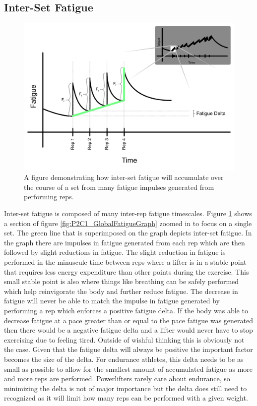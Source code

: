 \subsection{Inter-Set Fatigue}
\label{sec:P2C1_InterSetFatigue}

\begin{figure}[htb]
    \centering
    \includegraphics[scale=0.55]{images/ch2/InterSetFatigue.png}
    \caption{A figure demonstrating how inter-set fatigue will accumulate over the course of a set from many fatigue impulses generated from performing reps.}
    \label{fig:P2C1_InterSetFatigue}
\end{figure}

Inter-set fatigue is composed of many inter-rep fatigue timescales. Figure \ref{fig:P2C1_InterSetFatigue} shows a section of figure \ref{fig:P2C1_GlobalFatigueGraph} zoomed in to focus on a single set. The green line that is superimposed on the graph depicts inter-set fatigue. In the graph there are impulses in fatigue generated from each rep which are then followed by slight reductions in fatigue. The slight reduction in fatigue is performed in the minuscule time between reps where a lifter is in a stable point that requires less energy expenditure than other points during the exercise. This small stable point is also where things like breathing can be safely performed which help reinvigorate the body and further reduce fatigue. The decrease in fatigue will never be able to match the impulse in fatigue generated by performing a rep which enforces a positive fatigue delta. If the body was able to decrease fatigue at a pace greater than or equal to the pace fatigue was generated then there would be a negative fatigue delta and a lifter would never have to stop exercising due to feeling tired. Outside of wishful thinking this is obviously not the case. Given that the fatigue delta will always be positive the important factor becomes the size of the delta. For endurance athletes, this delta needs to be as small as possible to allow for the smallest amount of accumulated fatigue as more and more reps are performed. Powerlifters rarely care about endurance, so minimizing the delta is not of major importance but the delta does still need to recognized as it will limit how many reps can be performed with a given weight.

